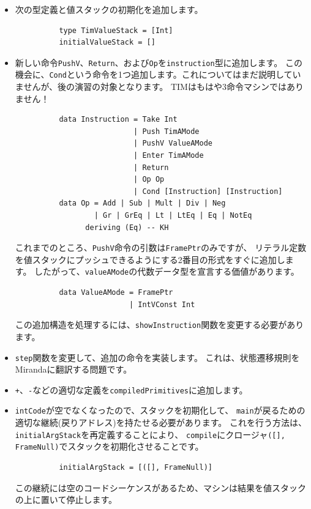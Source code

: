 \documentclass{jbook}
\begin{document}
\begin{itemize}
	\item 次の型定義と値スタックの初期化を追加します。
	      \begin{verbatim}
          type TimValueStack = [Int]
          initialValueStack = []
        \end{verbatim}
	\item 新しい命令\texttt{PushV}、\texttt{Return}、および\texttt{Op}を\texttt{instruction}型に追加します。
	      この機会に、\texttt{Cond}という命令を1つ追加します。これについてはまだ説明していませんが、後の演習の対象となります。
	      TIMはもはや3命令マシンではありません！
	      \begin{verbatim}
          data Instruction = Take Int
                           | Push TimAMode
                           | PushV ValueAMode
                           | Enter TimAMode
                           | Return
                           | Op Op
                           | Cond [Instruction] [Instruction]
          data Op = Add | Sub | Mult | Div | Neg
                  | Gr | GrEq | Lt | LtEq | Eq | NotEq
                deriving (Eq) -- KH
        \end{verbatim}
	      これまでのところ、\texttt{PushV}命令の引数は\texttt{FramePtr}のみですが、
	      リテラル定数を値スタックにプッシュできるようにする2番目の形式をすぐに追加します。
	      したがって、\texttt{valueAMode}の代数データ型を宣言する価値があります。
	      \begin{verbatim}
          data ValueAMode = FramePtr
                          | IntVConst Int
        \end{verbatim}
	      この追加構造を処理するには、\texttt{showInstruction}関数を変更する必要があります。
	\item \texttt{step}関数を変更して、追加の命令を実装します。
	      これは、状態遷移規則をMirandaに翻訳する問題です。
	\item \texttt{+}、\texttt{-}などの適切な定義を\texttt{compiledPrimitives}に追加します。
	\item \texttt{intCode}が空でなくなったので、スタックを初期化して、
	      \texttt{main}が戻るための適切な継続(戻りアドレス)を持たせる必要があります。
	      これを行う方法は、\texttt{initialArgStack}を再定義することにより、
	      \texttt{compile}にクロージャ\texttt{([], FrameNull)}でスタックを初期化させることです。
	      \begin{verbatim}
          initialArgStack = [([], FrameNull)]
        \end{verbatim}
	      この継続には空のコードシーケンスがあるため、マシンは結果を値スタックの上に置いて停止します。
\end{itemize}
\end{document}
